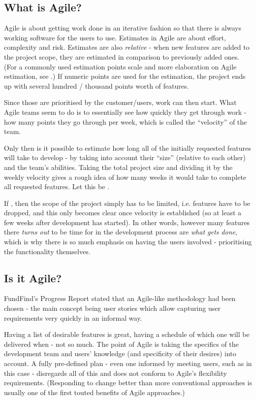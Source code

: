 \subsection{What is Agile?}
Agile is about getting work done in an iterative fashion so that there is always working software for the users to use. Estimates in Agile are about effort, complexity and risk. Estimates are also \emph{relative} - when new features are added to the project scope, they are estimated in comparison to previously added ones. (For a commonly used estimation points scale and more elaboration on Agile estimation, see \cite{agile-estimate}.) If numeric points are used for the estimation, the project ends up with several hundred / thousand points worth of features.

Since those are prioritised by the customer/users, work can then start. What Agile teams seem to do is to essentially see how quickly they get through work - how many points they go through per week, which is called the ``velocity'' of the team.

Only then is it possible to estimate how long all of the initially requested features will take to develop - by taking into account their ``size'' (relative to each other) and the team's abilities. Taking the total project size and dividing it by the weekly velocity gives a rough idea of how many weeks it would take to complete all requested features. Let this be .

If , then the scope of the project simply has to be limited, i.e. features have to be dropped, and this only becomes clear once velocity is established (so at least a few weeks after development has started). In other words, however many features there \emph{turns out} to be time for in the development process are \emph{what gets done}, which is why there is so much emphasis on having the users involved - prioritising the functionality themselves.

\subsection{Is it Agile?}

FundFind's Progress Report \cite{progress-report} stated that an Agile-like methodology had been chosen - the main concept being user stories which allow capturing user requirements very quickly in an informal way.

Having a list of desirable features is great, having a schedule of which one will be delivered when - not so much. The point of Agile is taking the specifics of the development team and users' knowledge (and specificity of their desires) into account. A fully pre-defined plan - even one informed by meeting users, such as in this case - disregards all of this and does not conform to Agile's flexibility requirements. (Responding to change better than more conventional approaches is usually one of the first touted benefits of Agile approaches.) 

